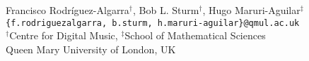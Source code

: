 \oneauthor
{Francisco Rodr\'iguez-Algarra$^{\dag}$,
  Bob L. Sturm$^{\dag}$,
  Hugo Maruri-Aguilar$^{\ddag}$}
{{\tt \{f.rodriguezalgarra, b.sturm, h.maruri-aguilar\}@qmul.ac.uk} \\
  $^\dag$Centre for Digital Music, 
  $^\ddag$School of Mathematical Sciences \\
  Queen Mary University of London, UK}
